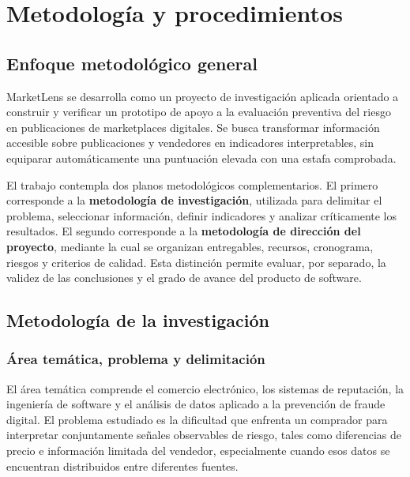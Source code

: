 
\chapter{Metodología y procedimientos}\label{cap:metodologia}

\section{Enfoque metodológico general}\label{sec:ml-enfoque}

MarketLens se desarrolla como un proyecto de investigación aplicada orientado a construir y verificar un prototipo de apoyo a la evaluación preventiva del riesgo en publicaciones de marketplaces digitales. Se busca transformar información accesible sobre publicaciones y vendedores en indicadores interpretables, sin equiparar automáticamente una puntuación elevada con una estafa comprobada.

El trabajo contempla dos planos metodológicos complementarios. El primero corresponde a la \textbf{metodología de investigación}, utilizada para delimitar el problema, seleccionar información, definir indicadores y analizar críticamente los resultados. El segundo corresponde a la \textbf{metodología de dirección del proyecto}, mediante la cual se organizan entregables, recursos, cronograma, riesgos y criterios de calidad. Esta distinción permite evaluar, por separado, la validez de las conclusiones y el grado de avance del producto de software.

\section{Metodología de la investigación}\label{sec:ml-metodologia-investigacion}

\subsection{Área temática, problema y delimitación}\label{subsec:ml-problema}

El área temática comprende el comercio electrónico, los sistemas de reputación, la ingeniería de software y el análisis de datos aplicado a la prevención de fraude digital. El problema estudiado es la dificultad que enfrenta un comprador para interpretar conjuntamente señales observables de riesgo, tales como diferencias de precio e información limitada del vendedor, especialmente cuando esos datos se encuentran distribuidos entre diferentes fuentes.

